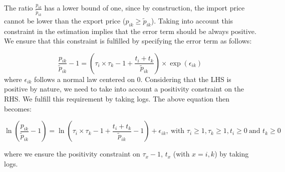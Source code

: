 \documentclass[a4paper,11pt]{article}
\begin{document}
The ratio $\frac{p_{ik}}{\widetilde{p}_{ik}}$ has a lower bound of one, since by construction, the import price cannot be lower than the export price ($p_{ik}\geq\widetilde{p}_{ik}$). Taking into account this constraint in the estimation implies that the error term should be always positive.
We ensure that this constraint is fulfilled by specifying the error term as follows:

\begin{equation*}
\frac{p_{ik}}{\widetilde{p}_{ik}}-1 =\left(\tau_{i}\times \tau_{k} -1+\frac{t_{i} + t_{k}}{\widetilde{p}_{ik}} \right)\times \exp(\epsilon_{ik})
\end{equation*}
\noindent where $\epsilon_{ik}$ follows a normal law centered on 0. Considering that the LHS is positive by nature, we need to take into account a positivity constraint on the RHS. We fulfill this requirement by taking logs. The above equation then becomes:

\begin{equation}
\ln\left(\frac{p_{ik}}{\widetilde{p}_{ik}}-1 \right)= \ln \left(\tau_{i}\times \tau_{k} -1+\frac{t_{i} + t_{k}}{\widetilde{p}_{ik}}-1 \right) + \epsilon_{ik}, ~\text{with } \tau_{i}\geq 1, \tau_{k}\geq 1, t_{i}\geq 0  ~\text{and }t_{k}\geq 0  \label{eq:equation0}
\end{equation}

\noindent where we ensure the positivity constraint on $\tau_x-1$, $t_x$ (with $x =i,k$) by taking logs. 
\end{document}
